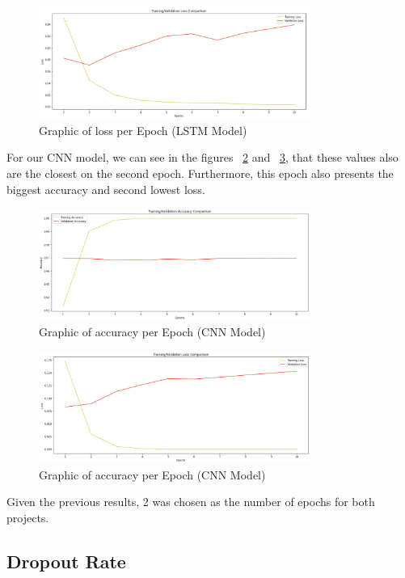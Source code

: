 \documentclass[conference]{IEEEtran}
\begin{document}
\begin{figure}[H]
    \centering
    \includegraphics[width=3.5in]{pictures/model1_epochs_loss.png}
    \caption{Graphic of loss per Epoch (LSTM Model)}\label{fig:epochsLSTM_loss}
\end{figure}

For our CNN model, we can see in the figures ~\ref{fig:epochsCNN_acc} and ~\ref{fig:epochsCNN_loss}, that these values also are the closest on the second epoch. Furthermore, this epoch also presents the biggest accuracy and second lowest loss.

\begin{figure}[H]
    \centering
    \includegraphics[width=3.5in]{pictures/model2_epochs_accuracy.png}
    \caption{Graphic of accuracy per Epoch (CNN Model)}\label{fig:epochsCNN_acc}
\end{figure}

\begin{figure}[H]
    \centering
    \includegraphics[width=3.5in]{pictures/model2_epochs_loss.png}
    \caption{Graphic of accuracy per Epoch (CNN Model)}\label{fig:epochsCNN_loss}
\end{figure}

Given the previous results, 2 was chosen as the number of epochs for both projects.

\subsection{Dropout Rate \cite{E} \cite{C}}
\end{document}
